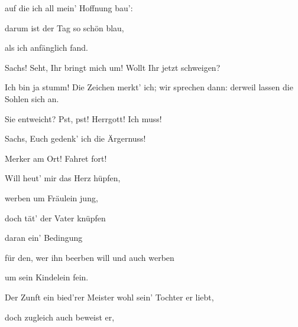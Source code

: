 \begin{drama}

auf die ich all mein' Hoffnung bau':


darum ist der Tag so schön blau,


als ich anfänglich fand.



\Beckmesserspeaks
Sachs! Seht, Ihr bringt mich um!
Wollt Ihr jetzt schweigen?

\Sachsspeaks
Ich bin ja stumm!
Die Zeichen merkt' ich; wir sprechen dann:
derweil lassen die Sohlen sich an.

\Beckmesserspeaks


Sie entweicht? Pst, pst! Herrgott! Ich muss!


Sachs, Euch gedenk' ich die Ärgernuss!



\Sachsspeaks


Merker am Ort! Fahret fort!

\Beckmesserspeaks


Will heut' mir das Herz hüpfen,


werben um Fräulein jung,


doch tät' der Vater knüpfen


daran ein' Bedingung


für den, wer ihn beerben
will und auch werben


um sein Kindelein fein.


Der Zunft ein bied'rer Meister
wohl sein' Tochter er liebt,


doch zugleich auch beweist er,


\end{drama}
